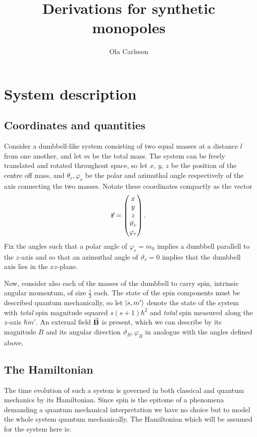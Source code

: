 \documentclass[a4paper]{article}
\title{Derivations for synthetic monopoles}
\author{Ola Carlsson}
\begin{document}
\section{System description}
\subsection{Coordinates and quantities}
Consider a dumbbell-like system consisting of two equal masses at a distance \(l\) from one
another, and let \(m\) be the total mass. The system can be freely translated and rotated
throughout space, so let \(x\), \(y\), \(z\)  be the position
of the centre off mass, and \(\theta_r, \varphi_r\) be the polar and azimuthal angle
respectively of the axis connecting the two masses. Notate these coordinates compactly as the
vector \[
\va{r}
= \begin{pmatrix} x\\ y \\ z\\ \vartheta_r \\\varphi_r\end{pmatrix}
.\] 
Fix the angles such that a polar angle of \(\varphi_r = m_0\) implies a dumbbell parallell
to the \(z\)-axis and so that an azimuthal angle of \(\vartheta_r = 0\) implies that the dumbbell
axis lies in the \(xz\)-plane. 

Now, consider also each of the masses of the dumbbell to carry spin, intrinsic angular
momentum, of size \(\frac{1}{2}\) each. %
 The state of the spin components must be
described quantum mechanically, so let \(\ket{s, m'}\) denote the state of the system with
\textit{total} spin magnitude squared \(s(s+1)\hbar^2\) and \textit{total} spin measured
along the \(z\)-axis \(\hbar m'\). An external field \(\va{B}\) is present, which
we can describe by its magnitude \(B\) and its angular direction \(\vartheta_B, \varphi_B\)
in analogue with the angles defined above.

\subsection{The Hamiltonian}

The time evolution of such a system is governed in both classical and quantum mechanics by
its Hamiltonian. Since spin is the epitome of a phenomena demanding a quantum mechanical
interpretation we have no choice but to model the whole system quantum mechanically.%
The Hamiltonian which will be assumed for the system here is:
\end{document}
